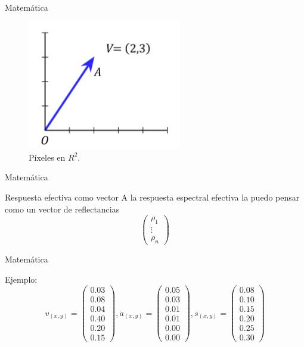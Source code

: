 \documentclass[]{beamer}
\begin{document}
\begin{frame}{Matemática}
  \begin{figure}
    \includegraphics[width=0.6\textwidth]{imagenes/vector.png}
    \caption{Píxeles en $R^2$.}
  \end{figure}
\end{frame}

\begin{frame}{Matemática}
  \begin{alertblock}{Respuesta efectiva como vector}
    A la respuesta espectral efectiva la puedo pensar como un vector de reflectancias
      $$\left(\begin{array}{c}
          \rho_1 \\
          \vdots \\
          \rho_n
        \end{array}
    \right) $$
  \end{alertblock}
  \pause
\end{frame}
\begin{frame}{Matemática}
  \begin{exampleblock}{Ejemplo:}
    $$v_{(x,y)}=\left(\begin{array}{c}
      0.03 \\
      0.08 \\
      0.04 \\
      0.40 \\
      0.20 \\
      0.15
    \end{array}
    \right),
    a_{(x,y)}=\left(\begin{array}{c}
      0.05 \\
      0.03 \\
      0.01 \\
      0.01 \\
      0.00 \\
      0.00
    \end{array}
    \right),
    s_{(x,y)}=\left(\begin{array}{c}
      0.08 \\
      0.10 \\
      0.15 \\
      0.20 \\
      0.25 \\
      0.30
    \end{array}
    \right) $$
  \end{exampleblock}
\end{frame}
\end{document}
